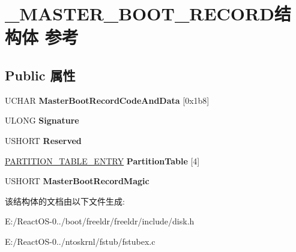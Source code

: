 \hypertarget{struct___m_a_s_t_e_r___b_o_o_t___r_e_c_o_r_d}{}\section{\+\_\+\+M\+A\+S\+T\+E\+R\+\_\+\+B\+O\+O\+T\+\_\+\+R\+E\+C\+O\+R\+D结构体 参考}
\label{struct___m_a_s_t_e_r___b_o_o_t___r_e_c_o_r_d}
\subsection*{Public 属性}
\begin{DoxyCompactItemize}
\item 
\mbox{\label{struct___m_a_s_t_e_r___b_o_o_t___r_e_c_o_r_d_a1872ef9f63fa088a7ef1e60e2e84c436}} 
U\+C\+H\+AR {\bfseries Master\+Boot\+Record\+Code\+And\+Data} \mbox{[}0x1b8\mbox{]}
\item 
\mbox{\label{struct___m_a_s_t_e_r___b_o_o_t___r_e_c_o_r_d_ae6a95f890ab24ab88d36a714ec682d02}} 
U\+L\+O\+NG {\bfseries Signature}
\item 
\mbox{\label{struct___m_a_s_t_e_r___b_o_o_t___r_e_c_o_r_d_ac91a06e838fb2388acd6df945bd07882}} 
U\+S\+H\+O\+RT {\bfseries Reserved}
\item 
\mbox{\label{struct___m_a_s_t_e_r___b_o_o_t___r_e_c_o_r_d_ac7ea555f85cc3c13b9ca0ab7a3add306}} 
\hyperlink{struct___p_a_r_t_i_t_i_o_n___t_a_b_l_e___e_n_t_r_y}{P\+A\+R\+T\+I\+T\+I\+O\+N\+\_\+\+T\+A\+B\+L\+E\+\_\+\+E\+N\+T\+RY} {\bfseries Partition\+Table} \mbox{[}4\mbox{]}
\item 
\mbox{\label{struct___m_a_s_t_e_r___b_o_o_t___r_e_c_o_r_d_a29fa96974c2326ca57d36875f6731a48}} 
U\+S\+H\+O\+RT {\bfseries Master\+Boot\+Record\+Magic}
\end{DoxyCompactItemize}


该结构体的文档由以下文件生成\+:\begin{DoxyCompactItemize}
\item 
E\+:/\+React\+O\+S-\/0../boot/freeldr/freeldr/include/disk.\+h\item 
E\+:/\+React\+O\+S-\/0../ntoskrnl/fstub/fstubex.\+c\end{DoxyCompactItemize}
